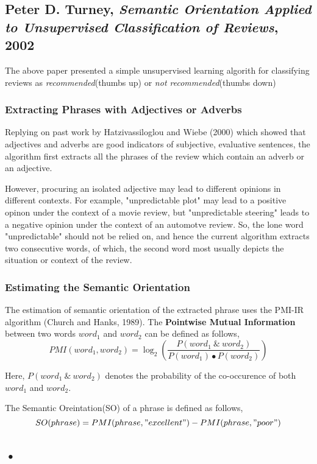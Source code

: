 \documentclass{llncs}
\begin{document}
\subsection{Peter D. Turney, \emph{Semantic Orientation Applied to Unsupervised Classification of Reviews}, 2002}

The above paper presented a simple unsupervised learning algorith  for classifying reviews as \emph{recommended}(thumbs up) or \emph{not recommended}(thumbs down)

\subsubsection{Extracting Phrases with Adjectives or Adverbs}
Replying on past work by Hatzivassiloglou and Wiebe (2000) which showed that adjectives and adverbs are good indicators of subjective, evaluative sentences, the algorithm first extracts all the phrases of the review which contain an adverb or an adjective.

However, procuring an isolated adjective may lead to different opinions in different contexts. For example, "unpredictable plot" may lead to a positive opinon under the context of a movie review, but "unpredictable steering" leads to a negative opinion under the context of an automotve review. So, the lone word "unpredictable" should not be relied on, and hence the current algorithm extracts two consecutive words, of which, the second word most usually depicts the situation or context of the review.

\subsubsection{Estimating the Semantic Orientation}
The estimation of semantic orientation of the extracted phrase uses the PMI-IR algorithm (Church and Hanks, 1989). The \textbf{Pointwise Mutual Information} between two words $word_1$ and $word_2$ can be defined as follows,
$$
PMI(word_1, word_2) = \log _2 \left( \dfrac{P(word_1 \ \& \ word_2)}{P(word_1) \bullet P(word_2)} \right)
$$

Here, $P(word_1 \ \& \ word_2)$ denotes the probability of the co-occurence of both $word_1$ and $word_2$.

The Semantic Oreintation(SO) of a phrase is defined as follows,
$$
SO(phrase) = PMI(phrase, "excellent") - PMI(phrase, "poor")
$$

\subsection{•}
\end{document}
